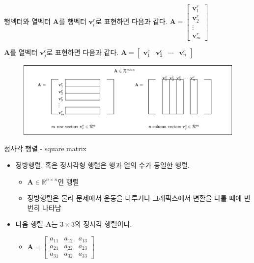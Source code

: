 

\begin{frame}{행벡터와 열벡터}
$\mathbf A$를 행벡터 $\mathbf v_i^r$로 표현하면 다음과 같다.
$\mathbf A = \left [ 
\begin{array}{c}
\mathbf v_1^r\\
\mathbf v_2^r\\
\vdots\\
\mathbf v_m^r
\end{array}
\right ]$

$\mathbf A$를 열벡터 $\mathbf v_j^c$로 표현하면 다음과 같다.
$\mathbf A = \left [ 
\begin{array}{cccc}
\mathbf v_1^c & \mathbf v_2^c & \cdots & \mathbf v_n^c
\end{array}
\right ]$

\begin{figure}
\includegraphics[width=12cm]{Math_matrix/matrixAsVectorCollection.eps}
\end{figure}

\end{frame}


\begin{frame}{정사각 행렬 - square matrix}

\begin{itemize}
\item 정방행렬, 혹은 정사각형 행렬은 행과 열의 수가 동일한 행렬.
	\begin{itemize}
	\item $\mathbf A \in \mathbb R^{n \times n}$인 행렬
	\item 정방행렬은 물리 문제에서 운동을 다루거나 그래픽스에서 변환을 다룰 때에 빈번히 나타남
	\end{itemize}
\item 다음 행렬 $\mathbf A$는 $3\times 3$의 정사각 행렬이다.
	\begin{itemize}
	\item $ \mathbf A = \left [ 
		\begin{array}{ccc}
		a_{11} & a_{12} & a_{13} \nonumber \\
		a_{21} & a_{22} & a_{23} \\
		a_{31} & a_{32} & a_{33} 
		\end{array}
		\right ] $
	\end{itemize}
\end{itemize}


\end{frame}


